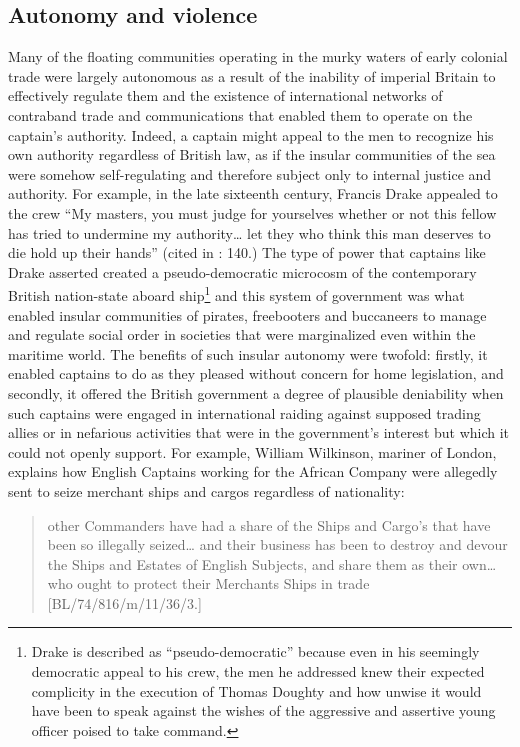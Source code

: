 \subsection{{Autonomy} {and} {violence}}%

Many of the floating communities operating in the murky waters of early colonial trade were largely autonomous as a result of the inability of imperial Britain to effectively regulate them and the existence of international networks of contraband trade and communications that enabled them to operate on the captain’s authority. Indeed, a captain might appeal to the men to recognize his own authority regardless of British law, as if the insular communities of the sea were somehow self-regulating and therefore subject only to internal justice and authority. For example, in the late sixteenth century, Francis Drake appealed to the crew “My masters, you must judge for yourselves whether or not this fellow has tried to undermine my authority… let they who think this man deserves to die hold up their hands” (cited in \citealt{Bicheno2012}: 140.) The type of power that captains like Drake asserted created a pseudo-democratic microcosm of the contemporary British nation-state aboard ship\footnote{Drake is described as “pseudo-democratic” because even in his seemingly democratic appeal to his crew, the men he addressed knew their expected complicity in the execution of Thomas Doughty and how unwise it would have been to speak against the wishes of the aggressive and assertive young officer poised to take command.}  and this system of government was what enabled insular communities of pirates, freebooters and buccaneers to manage and regulate social order in societies that were marginalized even within the maritime world. The benefits of such insular autonomy were twofold: firstly, it enabled captains to do as they pleased without concern for home legislation, and secondly, it offered the British government a degree of plausible deniability when such captains were engaged in international raiding against supposed trading allies or in nefarious activities that were in the government’s interest but which it could not openly support. For example, William Wilkinson, mariner of London, explains how English Captains working for the African Company were allegedly sent to seize merchant ships and cargos regardless of nationality: 

\begin{quotation}
other Commanders have had a share of the Ships and Cargo’s that have been so illegally seized… and their business has been to destroy and devour the Ships and Estates of English Subjects, and share them as their own… who ought to protect their Merchants Ships in trade [BL/74/816/m/11/36/3.] \end{quotation}

